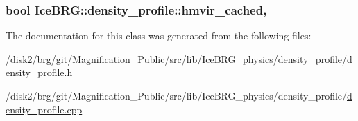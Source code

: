 \subsubsection[{hmvir\+\_\+cached}]{\setlength{\rightskip}{0pt plus 5cm}bool Ice\+B\+R\+G\+::density\+\_\+profile\+::hmvir\+\_\+cached\hspace{0.3cm}{\ttfamily [mutable]}, {\ttfamily [protected]}}\label{classIceBRG_1_1density__profile_a8a91facce74344d679864ee5267ed371}


The documentation for this class was generated from the following files\+:\begin{DoxyCompactItemize}
\item 
/disk2/brg/git/\+Magnification\+\_\+\+Public/src/lib/\+Ice\+B\+R\+G\+\_\+physics/density\+\_\+profile/\hyperlink{density__profile_8h}{density\+\_\+profile.\+h}\item 
/disk2/brg/git/\+Magnification\+\_\+\+Public/src/lib/\+Ice\+B\+R\+G\+\_\+physics/density\+\_\+profile/\hyperlink{density__profile_8cpp}{density\+\_\+profile.\+cpp}\end{DoxyCompactItemize}
